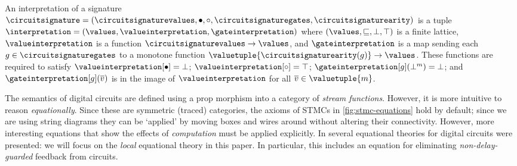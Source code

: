 \begin{definition}\label{def:interpretation}
    An interpretation of a signature \(
        \circuitsignature = (
            \circuitsignaturevalues,
            \bullet,
            \circ,
            \circuitsignaturegates,
            \circuitsignaturearity
        )
    \) is a tuple \(
        \interpretation = (
            \values,
            \valueinterpretation,
            \gateinterpretation
        )
    \) where \((\values,\sqsubseteq, \bot,\top)\) is a finite lattice,
    \(\valueinterpretation\) is a function
    \(\circuitsignaturevalues \to \values\),
    and \(\gateinterpretation\) is a map sending each \(
        g \in \circuitsignaturegates
    \) to a monotone function \(
        \valuetuple{\circuitsignaturearity(g)} \to \values
    \). These functions are required to satisfy \(
        \valueinterpretation[\bullet] = \bot
    \); \(
        \valueinterpretation[\circ] = \top
    \); \(
        \gateinterpretation[g](\bot^m) = \bot
    \); and \(
        \gateinterpretation[g](\overline{v})
    \) is in the image of \(\valueinterpretation\) for all \(
        \overline{v} \in \valuetuple{m}
    \).
\end{definition}

The semantics of digital circuits are defined using a prop morphism into
a category of \emph{stream functions}.
However, it is more intuitive to reason \emph{equationally}.
Since these are symmetric (traced) categories, the axioms of STMCs in
\cref{fig:stmc-equations} hold by default; since we are using string diagrams
they can be `applied' by moving boxes and wires around without altering their
connectivity.
However, more interesting equations that show the effects of \emph{computation}
must be applied explicitly.
In \cite{ghica2022compositional} several equational theories for digital
circuits were presented: we will focus on the \emph{local} equational theory
in this paper.
In particular, this includes an equation for eliminating
\emph{non-delay-guarded} feedback from circuits.


